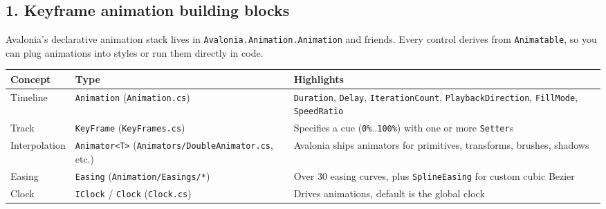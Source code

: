 \subsection{1. Keyframe animation building
blocks}\label{keyframe-animation-building-blocks}

Avalonia's declarative animation stack lives in
\passthrough{\lstinline!Avalonia.Animation.Animation!} and friends.
Every control derives from \passthrough{\lstinline!Animatable!}, so you
can plug animations into styles or run them directly in code.

\begin{longtable}[]{@{}
  >{\raggedright\arraybackslash}p{}
  >{\raggedright\arraybackslash}p{}
  >{\raggedright\arraybackslash}p{}@{}}
\toprule\noalign{}
\begin{minipage}[b]{\linewidth}\raggedright
Concept
\end{minipage} & \begin{minipage}[b]{\linewidth}\raggedright
Type
\end{minipage} & \begin{minipage}[b]{\linewidth}\raggedright
Highlights
\end{minipage} \\
\midrule\noalign{}
\endhead
\bottomrule\noalign{}
\endlastfoot
Timeline & \passthrough{\lstinline!Animation!}
(\passthrough{\lstinline!Animation.cs!}) &
\passthrough{\lstinline!Duration!}, \passthrough{\lstinline!Delay!},
\passthrough{\lstinline!IterationCount!},
\passthrough{\lstinline!PlaybackDirection!},
\passthrough{\lstinline!FillMode!},
\passthrough{\lstinline!SpeedRatio!} \\
Track & \passthrough{\lstinline!KeyFrame!}
(\passthrough{\lstinline!KeyFrames.cs!}) & Specifies a cue
(\passthrough{\lstinline!0\%!}..\passthrough{\lstinline!100\%!}) with
one or more \passthrough{\lstinline!Setter!}s \\
Interpolation & \passthrough{\lstinline!Animator<T>!}
(\passthrough{\lstinline!Animators/DoubleAnimator.cs!}, etc.) & Avalonia
ships animators for primitives, transforms, brushes, shadows \\
Easing & \passthrough{\lstinline!Easing!}
(\passthrough{\lstinline!Animation/Easings/*!}) & Over 30 easing curves,
plus \passthrough{\lstinline!SplineEasing!} for custom cubic Bezier \\
Clock & \passthrough{\lstinline!IClock!} /
\passthrough{\lstinline!Clock!} (\passthrough{\lstinline!Clock.cs!}) &
Drives animations, default is the global clock \\
\end{longtable}

